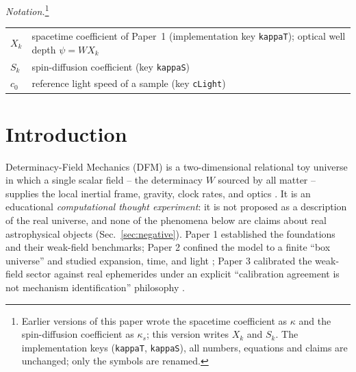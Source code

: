 \documentclass[aps,reprint,amsmath,amssymb,nofootinbib,superscriptaddress,floatfix]{revtex4-2}
\begin{document}
\noindent\textit{Notation.}\footnote{Earlier versions of this paper wrote the spacetime coefficient as $\kappa$ and the spin-diffusion coefficient as $\kappa_s$; this version writes $X_k$ and $S_k$. The implementation keys (\texttt{kappaT}, \texttt{kappaS}), all numbers, equations and claims are unchanged; only the symbols are renamed.}
\begin{center}
\small
\begin{tabular}{@{}lp{}@{}}
\hline
$X_k$ & spacetime coefficient of Paper~1 (implementation key \texttt{kappaT}); optical well depth $\psi = W X_k$ \\
$S_k$ & spin-diffusion coefficient (key \texttt{kappaS}) \\
$c_0$ & reference light speed of a sample (key \texttt{cLight}) \\
\hline
\end{tabular}
\end{center}

\section{Introduction}

Determinacy-Field Mechanics (DFM) is a two-dimensional relational toy
universe in which a single scalar field -- the determinacy $W$ sourced by
all matter -- supplies the local inertial frame, gravity, clock rates,
and optics \cite{paper1}. It is an educational \emph{computational
thought experiment}: it is not proposed as a description of the real
universe, and none of the phenomena below are claims about real
astrophysical objects (Sec.~\ref{sec:negative}). Paper 1 established the
foundations and their weak-field benchmarks; Paper 2 confined the model
to a finite ``box universe'' and studied expansion, time, and light
\cite{paper2}; Paper 3 calibrated the weak-field sector against real
ephemerides under an explicit ``calibration agreement is not mechanism
identification'' philosophy \cite{paper3}.
\end{document}
